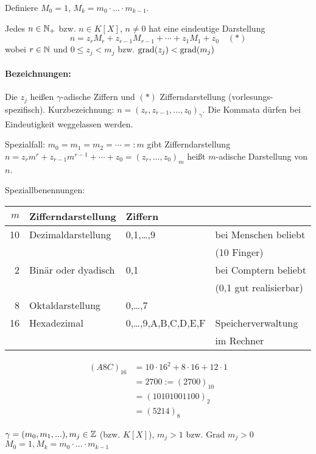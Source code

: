 \documentclass[a4paper,DIV15,BCOR12mm]{article}
\begin{document}
Definiere $M_0=1$, $M_k=m_0\cdot \ldots \cdot m_{k-1}$.

\begin{satz}[Ziffernsatz]
Jedes $n\in\mathbb{N}_+$ bzw. $n\in K[X]$, $n\ne 0$ hat eine eindeutige
Darstellung
\[n = z_rM_r + z_{r-1}M_{r-1} + \cdots + z_1M_1 + z_0 \quad (*)\]
wobei $r\in\mathbb{N}$ und $0\le z_j < m_j$ bzw. $\mathop{\rm grad}\nolimits(z_j) < \mathop{\rm grad}\nolimits(m_j)$

\end{satz}

\paragraph{Bezeichnungen:}
Die $z_j$ heißen $\gamma$-adische Ziffern und $(*)$
Zifferndarstellung (vorlesungs-spezifisch). Kurzbezeichnung:
$n=(z_r,z_{r-1},\ldots,z_0)_\gamma$. Die Kommata dürfen bei
Eindeutigkeit weggelassen werden.

Spezialfall: $m_0=m_1=m_2=\cdots=:m$ gibt Zifferndarstellung
$n=z_rm^r + z_{r-1}m^{r-1}+\cdots+z_0 = (z_r,\ldots,z_0)_m$ heißt
$m$-adische Darstellung von $n$.

Speziallbenennungen:\\
\begin{tabular}[h]{r|l|l|l}
$m$ & Zifferndarstellung & Ziffern &  \\
\hline
10 & Dezimaldarstellung & 0,1,\ldots,9  & bei Menschen beliebt\\ &&& (10 Finger) \\
2 & Binär oder dyadisch & 0,1 & bei Comptern beliebt \\ &&& (0,1 gut realisierbar)  \\
8 & Oktaldarstellung & 0,\ldots,7 & \\
16 & Hexadezimal & 0,\ldots,9,A,B,C,D,E,F & Speicherverwaltung \\ &&& im Rechner \\
\end{tabular}

\begin{beispiel}
\begin{align*}
(A8C)_{16} &= 10\cdot 16^2 + 8\cdot 16 + 12\cdot 1 \\
&= 2700 := (2700)_{10} \\
&= (10101001100)_2 \\
&= (5214)_8
\end{align*}
\end{beispiel}

$\gamma = (m_0, m_1, ...), m_j \in \mathbb{Z}$ (bzw. $K[X]$), $m_j > 1$ bzw. $\text{Grad } m_j > 0$\\
$M_0 = 1, M_k = m_0 \cdot ... \cdot m_{k-1}$
\end{document}

